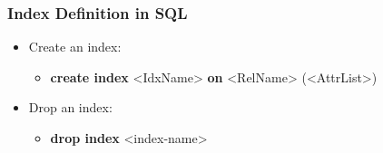 \subsubsection{Index Definition in SQL}
\begin{itemize}[label=\(\rhd\)]
    \item Create an index:
    \begin{itemize}[label=\(\rhd\)]
        \item[] \textbf{create index} <IdxName> \textbf{on} <RelName> (<AttrList>)
    \end{itemize}
    \item Drop an index:
    \begin{itemize}[label=\(\rhd\)]
        \item[] \textbf{drop index} <index-name>
    \end{itemize}
\end{itemize}



